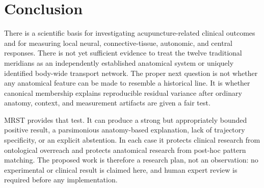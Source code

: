 \documentclass[conference]{IEEEtran}
\begin{document}
\section{Conclusion}

There is a scientific basis for investigating acupuncture-related clinical outcomes and for measuring local neural, connective-tissue, autonomic, and central responses. There is not yet sufficient evidence to treat the twelve traditional meridians as an independently established anatomical system or uniquely identified body-wide transport network. The proper next question is not whether any anatomical feature can be made to resemble a historical line. It is whether canonical membership explains reproducible residual variance after ordinary anatomy, context, and measurement artifacts are given a fair test.

MRST provides that test. It can produce a strong but appropriately bounded positive result, a parsimonious anatomy-based explanation, lack of trajectory specificity, or an explicit abstention. In each case it protects clinical research from ontological overreach and protects anatomical research from post-hoc pattern matching. The proposed work is therefore a research plan, not an observation: no experimental or clinical result is claimed here, and human expert review is required before any implementation.
\end{document}
